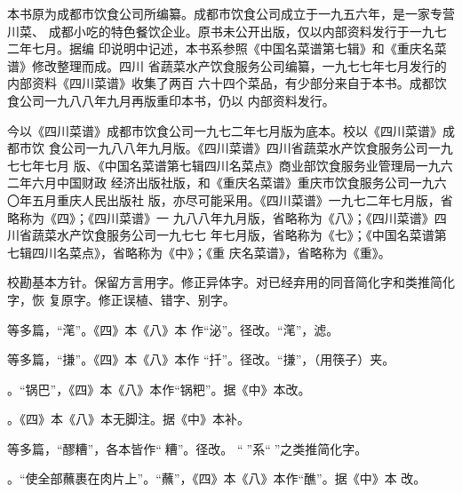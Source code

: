 \begin{list}{}{%
	\setlength{\topsep}{0pt}%
	\setlength{\leftmargin}{.529166mm}%
	\setlength{\rightmargin}{.529166mm}%
	\setlength{\listparindent}{\parindent}%
	\setlength{\itemindent}{\parindent}%
	\setlength{\parsep}{\parskip}%
	\addtolength{\textheight}{2.800060mm}%
}%
\item[]%

\vspace{0\baselineskip plus 1\baselineskip}%

本书原为成都市饮食公司所编纂。成都市饮食公司成立于一九五六年，是一家专营川菜、
成都小吃的特色餐饮企业。原书未公开出版，仅以内部资料发行于一九七二年七月。据编
印说明中记述，本书系参照《中国名菜谱第七辑》和《重庆名菜谱》修改整理而成。四川
省蔬菜水产饮食服务公司编纂，一九七七年七月发行的内部资料《四川菜谱》收集了两百
六十四个菜品，有少部分来自于本书。成都饮食公司一九八八年九月再版重印本书，仍以
内部资料发行。

今以《四川菜谱》成都市饮食公司一九七二年七月版为底本。校以《四川菜谱》成都市饮
食公司一九八八年九月版。《四川菜谱》四川省蔬菜水产饮食服务公司一九七七年七月
版、《中国名菜谱第七辑四川名菜点》商业部饮食服务业管理局一九六二年六月中国财政
经济出版社版，和《重庆名菜谱》重庆市饮食服务公司一九六〇年五月重庆人民出版社
版，亦尽可能采用。《四川菜谱》一九七二年七月版，省略称为《四》；《四川菜谱》一
九八八年九月版，省略称为《八》；《四川菜谱》四川省蔬菜水产饮食服务公司一九七七
年七月版，省略称为《七》；《中国名菜谱第七辑四川名菜点》，省略称为《中》；《重
庆名菜谱》，省略称为《重》。

校勘基本方针。保留方言用字。修正异体字。对已经弃用的同音简化字和类推简化字，恢
复原字。修正误植、错字、别字。

\vspace{1\baselineskip}%

等多篇，“滗”。《四》本《八》本
作“泌”。径改。“滗”，滤。

等多篇，“搛”。《四》本《八》本作
“扦”。径改。“搛”，（用筷子）夹。

。“锅巴”，《四》本《八》本作“锅粑”。据《中》本改。

。《四》本《八》本无脚注{\footnotesize{}}。据《中》本补。

等多篇，“醪糟”，各本皆作“𰪿糟”。径改。
“𰪿”系“𫃑”之类推简化字。

。“使全部蘸裹在肉片上”。“蘸”，《四》本《八》本作“醮”。据《中》本
改。


\end{list}
